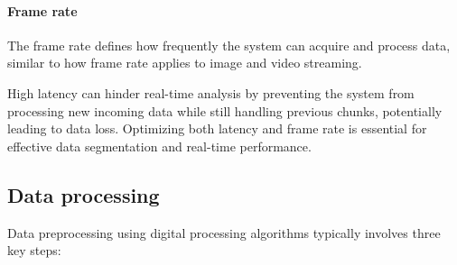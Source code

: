 \paragraph*{Frame rate}
The frame rate defines how frequently the system can acquire and process data, similar to how frame rate applies to image and video streaming.

High latency can hinder real-time analysis by preventing the system from processing new incoming data while still handling previous chunks, potentially leading to data loss. 
Optimizing both latency and frame rate is essential for effective data segmentation and real-time performance.

\subsection{Data processing}
Data preprocessing using digital processing algorithms typically involves three key steps:
